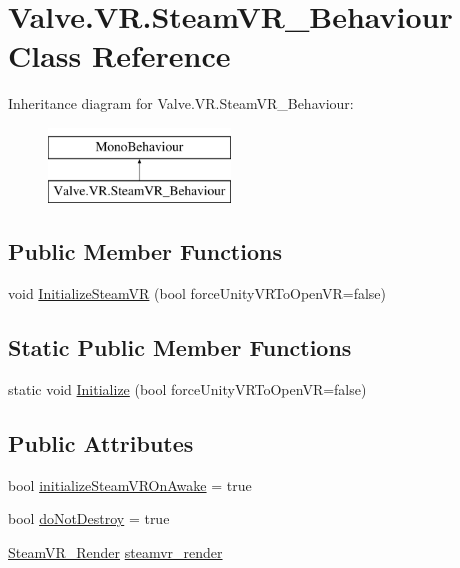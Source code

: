\hypertarget{class_valve_1_1_v_r_1_1_steam_v_r___behaviour}{}\section{Valve.\+V\+R.\+Steam\+V\+R\+\_\+\+Behaviour Class Reference}
\label{class_valve_1_1_v_r_1_1_steam_v_r___behaviour}
Inheritance diagram for Valve.\+V\+R.\+Steam\+V\+R\+\_\+\+Behaviour\+:\begin{figure}[H]
\begin{center}
\leavevmode
\includegraphics[height=2.000000cm]{class_valve_1_1_v_r_1_1_steam_v_r___behaviour}
\end{center}
\end{figure}
\subsection*{Public Member Functions}
\begin{DoxyCompactItemize}
\item 
void \mbox{\hyperlink{class_valve_1_1_v_r_1_1_steam_v_r___behaviour_a3170aec2fbeb80909b0ba9bf14596568}{Initialize\+Steam\+VR}} (bool force\+Unity\+V\+R\+To\+Open\+VR=false)
\end{DoxyCompactItemize}
\subsection*{Static Public Member Functions}
\begin{DoxyCompactItemize}
\item 
static void \mbox{\hyperlink{class_valve_1_1_v_r_1_1_steam_v_r___behaviour_a973a93206dbe36401d7cb5173e772420}{Initialize}} (bool force\+Unity\+V\+R\+To\+Open\+VR=false)
\end{DoxyCompactItemize}
\subsection*{Public Attributes}
\begin{DoxyCompactItemize}
\item 
bool \mbox{\hyperlink{class_valve_1_1_v_r_1_1_steam_v_r___behaviour_a85091fbb46932f9ecdca589fe0f5eaa9}{initialize\+Steam\+V\+R\+On\+Awake}} = true
\item 
bool \mbox{\hyperlink{class_valve_1_1_v_r_1_1_steam_v_r___behaviour_a352d30f6855343fe428deff126d0add9}{do\+Not\+Destroy}} = true
\item 
\mbox{\hyperlink{class_valve_1_1_v_r_1_1_steam_v_r___render}{Steam\+V\+R\+\_\+\+Render}} \mbox{\hyperlink{class_valve_1_1_v_r_1_1_steam_v_r___behaviour_a03d34792871c3e0aa336088e306257dd}{steamvr\+\_\+render}}
\end{DoxyCompactItemize}

